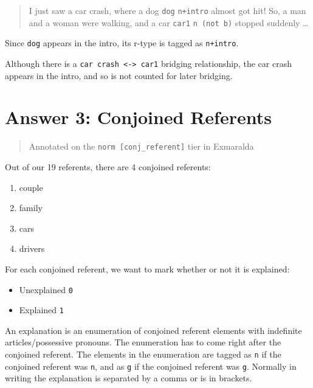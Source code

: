\documentclass[
]{book}
\providecommand{\tightlist}{%
  \setlength{\itemsep}{0pt}\setlength{\parskip}{0pt}}
\begin{document}
\begin{quote}
I just saw a car crash, where a dog \texttt{dog} \texttt{n+intro} almost got hit!
So, a man and a woman were walking, and a car \texttt{car1} \texttt{n\ (not\ b)} stopped suddenly \ldots{}
\end{quote}

Since \texttt{dog} appears in the intro, its r-type is tagged as \texttt{n+intro}.

Although there is a \texttt{car\ crash\ \textless{}-\textgreater{}\ car1} bridging relationship,
the car crash appears in the intro, and so is not counted for later bridging.

\hypertarget{answer-3-conjoined-referents}{%
\chapter{Answer 3: Conjoined Referents}\label{answer-3-conjoined-referents}}

\begin{quote}
Annotated on the \texttt{norm\ {[}conj\_referent{]}} tier in Exmaralda
\end{quote}

Out of our 19 referents, there are 4 conjoined referents:

\begin{enumerate}
\def\labelenumi{\arabic{enumi}.}
\tightlist
\item
  couple
\item
  family
\item
  cars
\item
  drivers
\end{enumerate}

For each conjoined referent, we want to mark whether or not it is explained:

\begin{itemize}
\tightlist
\item
  Unexplained \texttt{0}
\item
  Explained \texttt{1}
\end{itemize}

An explanation is an enumeration of conjoined referent elements with indefinite articles/possessive pronouns.
The enumeration has to come right after the conjoined referent.
The elements in the enumeration are tagged as \texttt{n} if the conjoined referent was \texttt{n}, and as \texttt{g} if the conjoined referent was \texttt{g}.
Normally in writing the explanation is separated by a comma or is in brackets.
\end{document}
